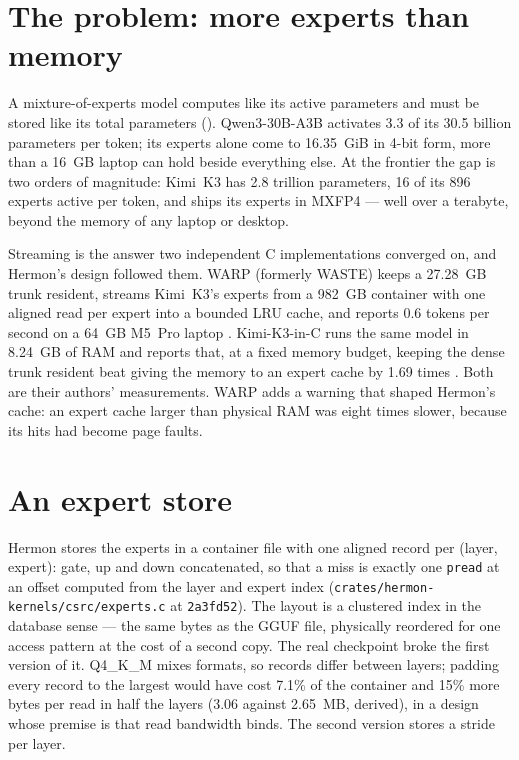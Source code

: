 \section{The problem: more experts than memory}

A mixture-of-experts model computes like its active parameters and must be
stored like its total parameters (). Qwen3-30B-A3B
activates 3.3 of its 30.5 billion parameters per token; its experts alone come
to 16.35~GiB in 4-bit form, more than a 16~GB laptop can hold beside everything
else. At the frontier the gap is two orders of magnitude: Kimi~K3 has 2.8
trillion parameters, 16 of its 896 experts active per token, and ships its
experts in MXFP4 \cite{moonshot2026kimik3} --- well over a terabyte, beyond
the memory of any laptop or desktop.

Streaming is the answer two independent C implementations converged on, and
Hermon's design followed them. WARP (formerly WASTE) keeps a 27.28~GB trunk
resident, streams Kimi~K3's experts from a 982~GB container with one aligned
read per expert into a bounded LRU cache, and reports 0.6 tokens per second on
a 64~GB M5~Pro laptop \cite{sqliteai2026warp}. Kimi-K3-in-C runs the same model
in 8.24~GB of RAM and reports that, at a fixed memory budget, keeping the dense
trunk resident beat giving the memory to an expert cache by 1.69 times
\cite{khan2026kimik3c}. Both are their authors' measurements. WARP adds a
warning that shaped Hermon's cache: an expert cache larger than physical RAM was
eight times slower, because its hits had become page faults.

\section{An expert store}

Hermon stores the experts in a container file with one aligned record per
(layer, expert): gate, up and down concatenated, so that a miss is exactly one
\texttt{pread} at an offset computed from the layer and expert index
(\texttt{crates/hermon-kernels/csrc/experts.c} at \texttt{2a3fd52}). The layout is
a clustered index in the database sense --- the same bytes as the GGUF file,
physically reordered for one access pattern at the cost of a second copy. The
real checkpoint broke the first version of it. Q4\_K\_M mixes formats, so records
differ between layers; padding every record to the largest would have cost
7.1\% of the container and 15\% more bytes per read in half the layers
(3.06 against 2.65~MB, derived), in a design whose premise is that read
bandwidth binds. The second version stores a stride per layer.

